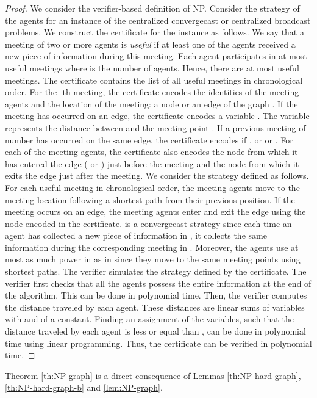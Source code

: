 \documentclass{article}
\newcommand\strat{\mbox{strategy}\xspace}
\newcommand\ccast{convergecast\xspace}
\newcommand\cccast{centralized convergecast\xspace}
\begin{document}
\begin{proof}
We consider the verifier-based definition of NP. Consider the {\strat}  of the agents for an instance of the {\cccast} or centralized broadcast problems. We construct the certificate for the instance as follows. We say that a meeting of two or more agents is \emph{useful} if at least one of the agents received a new piece of information during this meeting. Each agent participates in at most  useful meetings where  is the number of agents. Hence, there are at most  useful meetings. The certificate contains the list of all useful meetings in chronological order. For the -th meeting, the certificate encodes the identities of the meeting agents and the location of the meeting: a node   or an edge  of the graph . If the meeting has occurred on an edge, the certificate encodes a variable . The variable   represents the distance between  and the meeting point . If a previous meeting of number  has occurred on the same edge, the certificate encodes if , or  or . For each of the meeting agents, the certificate also encodes the node from which it has entered the edge ( or ) just before the meeting and the node from which it exits the edge just after the meeting. We consider the {\strat}  defined as follows. For each useful meeting in chronological order, the meeting agents move to the meeting location following a shortest path from their previous position. If the meeting occurs on an edge, the meeting agents enter and exit the edge using the node encoded in the certificate.  is a {\ccast} {\strat} since each time an agent has collected a new piece of information in , it collects the same information during the corresponding meeting in . Moreover, the agents use at most as much power in  as in  since they move to the same meeting points using shortest paths. The verifier simulates the {\strat}  defined by the certificate. The verifier first checks that all the agents possess the entire information at the end of the algorithm. This can be done in polynomial time. Then, the verifier computes the distance traveled by each agent. These distances are linear sums of variables  with  and of a constant. Finding an assignment of the variables, such that the distance traveled by each agent is less or equal than , can be done in polynomial time using linear programming. Thus, the certificate can be verified in polynomial time.
\end{proof}

Theorem \ref{th:NP-graph} is a direct consequence of Lemmas \ref{th:NP-hard-graph}, \ref{th:NP-hard-graph-b} and \ref{lem:NP-graph}.
\end{document}
